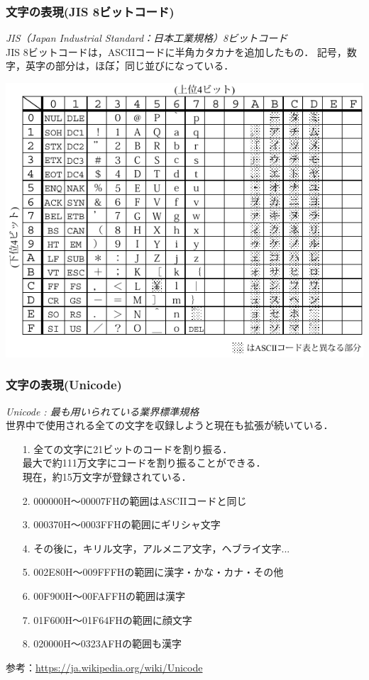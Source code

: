 \documentclass[handout]{beamer}        %
\begin{document}
\begin{frame}
  \frametitle{文字の表現(JIS 8ビットコード)}
  \emph{JIS（Japan Industrial Standard：日本工業規格）8ビットコード}\\
  JIS 8ビットコードは，ASCIIコードに半角カタカナを追加したもの．
  記号，数字，英字の部分は，\.ほ\.ぼ，同じ並びになっている．

  \centerline{\includegraphics[scale=0.85]{../chap2/jisx0201.pdf}}

\end{frame}

\begin{frame}
  \frametitle{文字の表現(Unicode)}
  \emph{Unicode : 最も用いられている業界標準規格}\\
  世界中で使用される全ての文字を収録しようと現在も拡張が続いている．
  \begin{enumerate}
    \item[1.] 全ての文字に21ビットのコードを割り振る．\\
          最大で約111万文字にコードを割り振ることができる．\\
          現在，約15万文字が登録されている．
    \item[2.] 000000H〜00007FHの範囲はASCIIコードと同じ
    \item[3.] 000370H〜0003FFHの範囲にギリシャ文字
    \item[4.] その後に，キリル文字，アルメニア文字，ヘブライ文字...
    \item[5.] 002E80H〜009FFFHの範囲に漢字・かな・カナ・その他
    \item[6.] 00F900H〜00FAFFHの範囲は漢字
    \item[7.] 01F600H〜01F64FHの範囲に顔文字
    \item[8.] 020000H〜0323AFHの範囲も漢字
  \end{enumerate} 
  参考：\url{https://ja.wikipedia.org/wiki/Unicode}
\end{frame}
\end{document}
